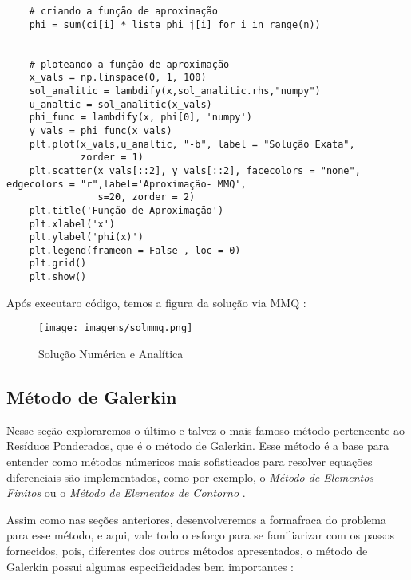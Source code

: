 \documentclass[a4paper, 12pt]{article}
\numberwithin{equation}{section}
\begin{document}
\begin{lstlisting}
    # criando a função de aproximação
    phi = sum(ci[i] * lista_phi_j[i] for i in range(n))
   
    
    # ploteando a função de aproximação
    x_vals = np.linspace(0, 1, 100)
    sol_analitic = lambdify(x,sol_analitic.rhs,"numpy")
    u_analtic = sol_analitic(x_vals)
    phi_func = lambdify(x, phi[0], 'numpy')
    y_vals = phi_func(x_vals)
    plt.plot(x_vals,u_analtic, "-b", label = "Solução Exata",
             zorder = 1)
    plt.scatter(x_vals[::2], y_vals[::2], facecolors = "none", edgecolors = "r",label='Aproximação- MMQ',
                s=20, zorder = 2)
    plt.title('Função de Aproximação')
    plt.xlabel('x')
    plt.ylabel('phi(x)')
    plt.legend(frameon = False , loc = 0)
    plt.grid()
    plt.show()

\end{lstlisting}


Após executaro código, temos a figura da solução via MMQ : 


\begin{figure}[!htp]
    \centering
    \texttt{[image: imagens/solmmq.png]}
    \caption{Solução Numérica e Analítica}
\end{figure}





\newpage



\subsection{Método de Galerkin}
Nesse seção exploraremos o último e talvez o mais famoso método pertencente ao Resíduos Ponderados, que é o 
método de Galerkin.  Esse método é a base para entender como métodos númericos mais sofisticados para resolver 
equações diferenciais são implementados, como por exemplo, o \textit{Método de Elementos Finitos} ou o 
\textit{Método de Elementos de Contorno } \citep{zienkiewicz2005}. 

Assim como nas seções anteriores, desenvolveremos a formafraca do problema para esse método, e aqui, vale 
todo o esforço para se familiarizar com os passos fornecidos, pois, diferentes dos outros métodos apresentados, o método de Galerkin 
possui algumas  especificidades bem importantes : 
\end{document}
